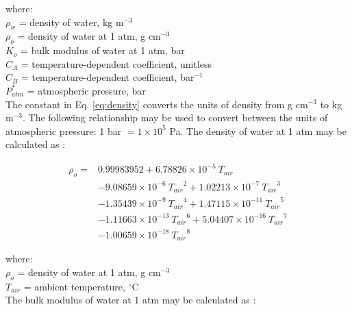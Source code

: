 \noindent where: \\
\indent $\rho_w$ = density of water, kg m$^{-3}$\\
\indent $\rho_o$ = density of water at 1 atm, g cm$^{-3}$\\
\indent $K_o$ = bulk modulus of water at 1 atm, bar\\
\indent $C_A$ = temperature-dependent coefficient, unitless\\
\indent $C_B$ = temperature-dependent coefficient, bar$^{-1}$\\
\indent $P_{atm}^{\ast}$ = atmospheric pressure, bar\\

\noindent The constant in Eq. \ref{eq:density} converts the units of density from g cm$^{-3}$ to kg m$^{-3}$. 
The following relationship may be used to convert between the units of atmospheric pressure: 1 bar $= 1\times 10^5$ Pa. 
The density of water at 1 atm may be calculated as \parencite{chen77, kell75}:

\begin{equation}
\label{eq:datm}
	\begin{split}
		\rho_o = & 0.99983952 + 6.78826\times 10^{-5}\: T_{air} \\
		          & -9.08659\times 10^{-6}\: {T_{air}}^2 
		            + 1.02213\times 10^{-7}\: {T_{air}}^3\\
		          & -1.35439\times 10^{-9}\: {T_{air}}^4 
		            + 1.47115\times 10^{-11}\: {T_{air}}^5\\
		          & -1.11663\times 10^{-13}\: {T_{air}}^6 
		            + 5.04407\times 10^{-16}\: {T_{air}}^7\\
		          & -1.00659\times 10^{-18}\: {T_{air}}^8
	\end{split}
\end{equation}

\noindent where: \\
\indent $\rho_o$ = density of water at 1 atm, g cm$^{-3}$\\
\indent $T_{air}$ = ambient temperature, $^{\circ}$C\\

\noindent The bulk modulus of water at 1 atm may be calculated as \parencite{chen77, kell75}:

